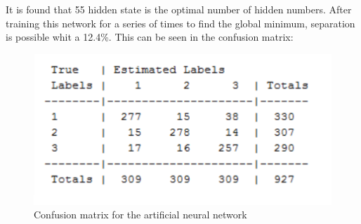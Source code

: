 It is found that 55 hidden state is the optimal number of hidden numbers. After training this network for a series of times to find the global minimum, separation is possible whit a 12.4\%. This can be seen in the confusion matrix: 

\begin{figure}[H]
\centering
\includegraphics[scale=0.8]{billeder/conmatnn}
\caption{Confusion matrix for the artificial neural network }
\label{fig:conmatnn}
\end{figure}
